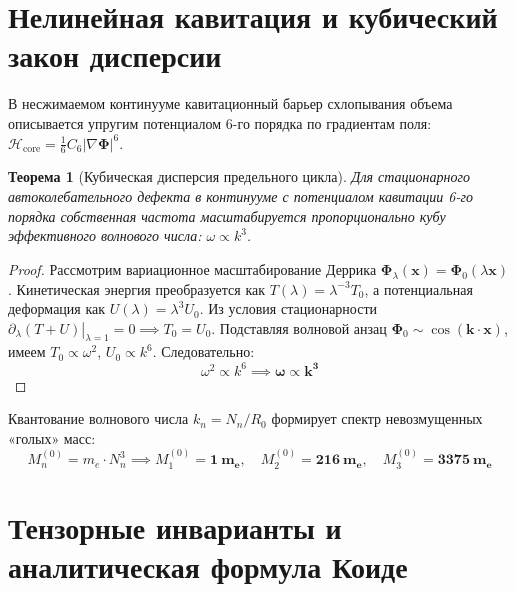 \documentclass[12pt,a4paper]{article}
\newtheorem{theorem}{Теорема}
\begin{document}
	\section{Нелинейная кавитация и кубический закон дисперсии}
	
	В несжимаемом континууме кавитационный барьер схлопывания объема описывается упругим потенциалом 6-го порядка по градиентам поля: $\mathcal{H}_{\text{core}} = \frac{1}{6} C_6 |\nabla \boldsymbol{\Phi}|^6$.
	
	\begin{theorem}[Кубическая дисперсия предельного цикла]
		Для стационарного автоколебательного дефекта в континууме с потенциалом кавитации 6-го порядка собственная частота масштабируется пропорционально кубу эффективного волнового числа: $\omega \propto k^3$.
	\end{theorem}
	
	\begin{proof}
		Рассмотрим вариационное масштабирование Деррика $\boldsymbol{\Phi}_\lambda(\mathbf{x}) = \boldsymbol{\Phi}_0(\lambda \mathbf{x})$. Кинетическая энергия преобразуется как $T(\lambda) = \lambda^{-3} T_0$, а потенциальная деформация как $U(\lambda) = \lambda^3 U_0$. 
		Из условия стационарности $\left. \partial_\lambda (T + U) \right|_{\lambda=1} = 0 \implies T_0 = U_0$. 
		Подставляя волновой анзац $\boldsymbol{\Phi}_0 \sim \cos(\mathbf{k} \cdot \mathbf{x})$, имеем $T_0 \propto \omega^2$, $U_0 \propto k^6$. Следовательно:
		\begin{equation}
			\omega^2 \propto k^6 \implies \mathbf{\omega \propto k^3}
		\end{equation}
	\end{proof}
	
	Квантование волнового числа $k_n = N_n / R_0$ формирует спектр невозмущенных «голых» масс:
	\begin{equation}
		M_n^{(0)} = m_e \cdot N_n^3 \implies M_1^{(0)} = \mathbf{1 \ m_e}, \quad M_2^{(0)} = \mathbf{216 \ m_e}, \quad M_3^{(0)} = \mathbf{3375 \ m_e}
	\end{equation}
	
	\section{Тензорные инварианты и аналитическая формула Коиде}
	
\end{document}
